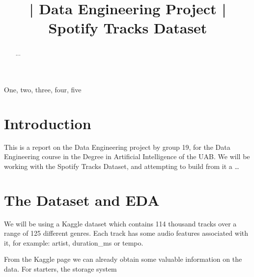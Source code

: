 \documentclass{article}
\title{| Data Engineering Project | \\ Spotify Tracks Dataset}
\begin{document}
%
\maketitle
%
\begin{abstract}
...
\end{abstract}
%
\begin{keywords}
One, two, three, four, five
\end{keywords}
%
\section{Introduction}
\label{sec:intro}

This is a report on the Data Engineering project by group 19, for the Data Engineering course in the Degree in
Artificial Intelligence of the UAB. We will be working with the Spotify Tracks Dataset, and attempting to build from it a
\dots
\section{The Dataset and EDA}
We will be using a Kaggle dataset which contains 114 thousand tracks over a range of 125 different genres. 
Each track has some audio features associated with it, for example: artist, duration\_ms or tempo. 

From the Kaggle page we can already obtain some valuable information on the data. For starters, the storage system




\end{document}
